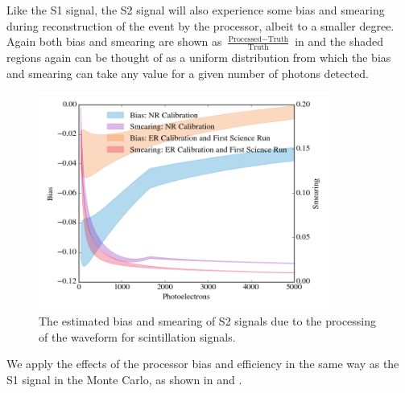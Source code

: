 
Like the S1 signal, the S2 signal will also experience some bias and smearing during reconstruction of the event by the processor, albeit to a smaller degree.  Again both bias and smearing are shown as $\frac{\textrm{Processed} - \textrm{Truth}}{\textrm{Truth}}$ in  and the shaded regions again can be thought of as a uniform distribution from which the bias and smearing can take any value for a given number of photons detected.  

\begin{figure}[t]
	\centering
	\includegraphics[width=0.85\textwidth]{xe1t_pax_s2_bias}
	\caption{The estimated bias and smearing of S2 signals due to the processing of the waveform for scintillation signals.}
	\label{fig:xe1t_s2_sb}
\end{figure}


We apply the effects of the processor bias and efficiency in the same way as the S1 signal in the Monte Carlo, as shown in  and .  

